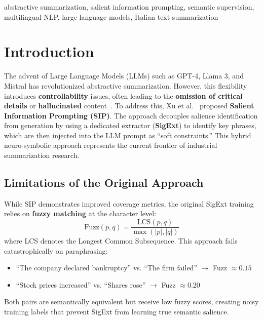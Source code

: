 \documentclass[conference]{IEEEtran}
\begin{document}
\begin{IEEEkeywords}
abstractive summarization, salient information prompting, semantic supervision, multilingual NLP, large language models, Italian text summarization
\end{IEEEkeywords}

\section{Introduction}

The advent of Large Language Models (LLMs) such as GPT-4, Llama 3, and Mistral has revolutionized abstractive summarization. However, this flexibility introduces \textbf{controllability} issues, often leading to the \textbf{omission of critical details} or \textbf{hallucinated} content~\cite{maynez2020faithfulness, cao2022hallucination}. To address this, Xu et al.~\cite{xu2024sip} proposed \textbf{Salient Information Prompting (SIP)}. The approach decouples salience identification from generation by using a dedicated extractor (\textbf{SigExt}) to identify key phrases, which are then injected into the LLM prompt as ``soft constraints.'' This hybrid neuro-symbolic approach represents the current frontier of industrial summarization research.

\subsection{Limitations of the Original Approach}

While SIP demonstrates improved coverage metrics, the original SigExt training relies on \textbf{fuzzy matching} at the character level:
\begin{equation}
\text{Fuzz}(p, q) = \frac{\text{LCS}(p, q)}{\max(|p|, |q|)}
\label{eq:fuzzy}
\end{equation}
where LCS denotes the Longest Common Subsequence. This approach fails catastrophically on paraphrasing:
\begin{itemize}
    \item ``The company declared bankruptcy'' vs. ``The firm failed'' $\rightarrow$ Fuzz $\approx 0.15$
    \item ``Stock prices increased'' vs. ``Shares rose'' $\rightarrow$ Fuzz $\approx 0.20$
\end{itemize}

Both pairs are semantically equivalent but receive low fuzzy scores, creating noisy training labels that prevent SigExt from learning true semantic salience.
\end{document}

